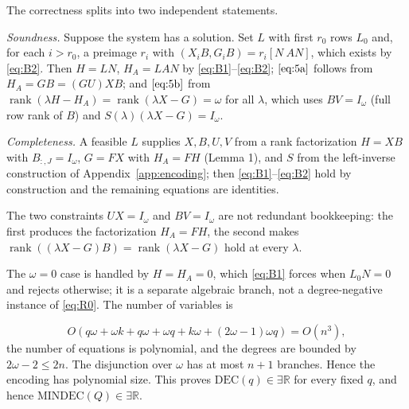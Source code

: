 \documentclass[journal]{IEEEtran}
\theoremstyle{plainn}
\theoremstyle{remark}
\begin{document}
The correctness splits into two independent statements.

\emph{Soundness.} Suppose the system has a solution. Set $L$ with first $r_0$ rows $L_0$ and, for each $i>r_0$, a preimage $r_i$ with $(X_iB,G_iB)=r_i[N\ AN]$, which exists by \eqref{eq:B2}. Then $H=LN$, $H_A=LAN$ by \eqref{eq:B1}--\eqref{eq:B2}; $\eqref{eq:5a}$ follows from $H_A=GB=(GU)XB$; and $\eqref{eq:5b}$ from $\operatorname{rank}(\lambda H-H_A)=\operatorname{rank}(\lambda X-G)=\omega$ for all $\lambda$, which uses $BV=I_\omega$ (full row rank of $B$) and $S(\lambda)(\lambda X-G)=I_\omega$.

\emph{Completeness.} A feasible $L$ supplies $X,B,U,V$ from a rank factorization $H=XB$ with $B_{:,J}=I_\omega$, $G=FX$ with $H_A=FH$ (Lemma 1), and $S$ from the left-inverse construction of Appendix~\ref{app:encoding}; then \eqref{eq:B1}--\eqref{eq:B2} hold by construction and the remaining equations are identities.

The two constraints $UX=I_\omega$ and $BV=I_\omega$ are not redundant bookkeeping: the first produces the factorization $H_A=FH$, the second makes $\operatorname{rank}((\lambda X-G)B)=\operatorname{rank}(\lambda X-G)$ hold at every $\lambda$.

The $\omega=0$ case is handled by $H=H_A=0$, which \eqref{eq:B1} forces when $L_0N=0$ and rejects otherwise; it is a separate algebraic branch, not a degree-negative instance of \eqref{eq:R0}. The number of variables is

\begin{equation}
O(q\omega+\omega k+q\omega+\omega q+k\omega+(2\omega-1)\omega q)
=O(n^3),
\end{equation}
the number of equations is polynomial, and the degrees are bounded by $2\omega-2\le2n$. The disjunction over $\omega$ has at most $n+1$ branches. Hence the encoding has polynomial size. This proves $\mathrm{DEC}(q)\in\exists\mathbb R$ for every fixed $q$, and hence $\mathrm{MINDEC}(Q)\in\exists\mathbb R$.
\end{document}
